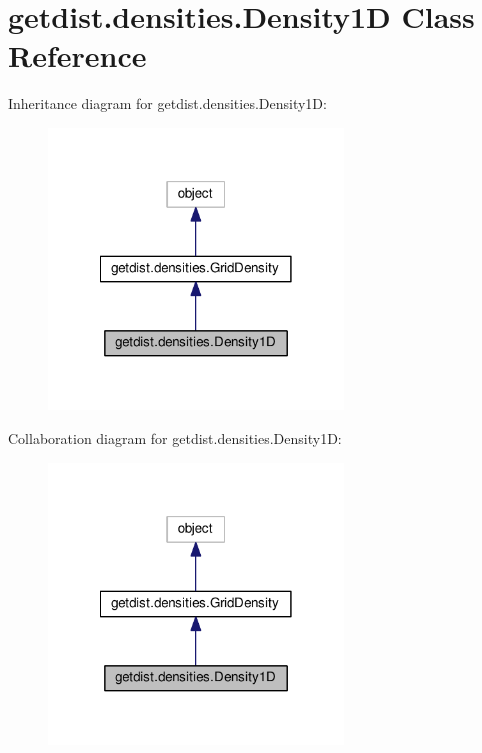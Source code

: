 \hypertarget{classgetdist_1_1densities_1_1Density1D}{}\section{getdist.\+densities.\+Density1D Class Reference}
\label{classgetdist_1_1densities_1_1Density1D}


Inheritance diagram for getdist.\+densities.\+Density1D\+:
\nopagebreak
\begin{figure}[H]
\begin{center}
\leavevmode
\includegraphics[width=222pt]{classgetdist_1_1densities_1_1Density1D__inherit__graph}
\end{center}
\end{figure}


Collaboration diagram for getdist.\+densities.\+Density1D\+:
\nopagebreak
\begin{figure}[H]
\begin{center}
\leavevmode
\includegraphics[width=222pt]{classgetdist_1_1densities_1_1Density1D__coll__graph}
\end{center}
\end{figure}
